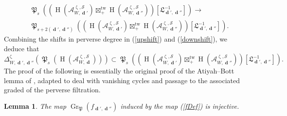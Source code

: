 \documentclass[a4paper,10pt]{amsart}
\renewcommand{\zeta}{\upzeta}
\newtheorem{proposition}[theorem]{Proposition}
\newtheorem{lemma}[theorem]{Lemma}
\DeclareMathOperator{\Pf}{\mathfrak{P}}
\newcommand{\SP}{\mathcal{S}}
\DeclareMathOperator{\tw}{tw}
\DeclareMathOperator{\Gr}{Gr}
\DeclareMathOperator{\dd}{\mathbf{d}}
\DeclareMathOperator{\HO}{H}
\begin{document}
\begin{align}
\nonumber&\Pf_s\left(\left(\HO(\mathcal{A}_{W,\dd'}^{\zeta,\SP})\boxtimes^{\tw}_+ \HO(\mathcal{A}_{W,\dd''}^{\zeta,\SP})\right)[\mathfrak{L}^{-1}_{\dd',\dd''}]\right)\rightarrow \\ \label{upshift}
&\Pf_{s+2(\dd',\dd'')}\left(\left(\HO(\mathcal{A}_{W,\dd'}^{\zeta,\SP})\boxtimes^{\tw}_+ \HO(\mathcal{A}_{W,\dd''}^{\zeta,\SP})\right)[\mathfrak{L}^{-1}_{\dd',\dd''}]\right).
\end{align}
Combining the shifts in perverse degree in (\ref{upshift}) and (\ref{downshift}), we deduce that
\[
\Delta^{\zeta}_{W,\dd',\dd''}\left(\Pf_s \left(\HO\left(\mathcal{A}^{\zeta,\SP}_{W,\dd}\right)\right)\right)\subset \Pf_s\left(\left(\HO(\mathcal{A}_{W,\dd'}^{\zeta,\SP})\boxtimes^{\tw}_+ \HO(\mathcal{A}_{W,\dd''}^{\zeta,\SP})\right)[\mathfrak{L}^{-1}_{\dd',\dd''}]\right).
\]
The proof of the following is essentially the original proof of the Atiyah--Bott lemma of \cite{AtBo83}, adapted to deal with vanishing cycles and passage to the associated graded of the perverse filtration.
\begin{lemma}
\label{PAB}
The map $\Gr_{\Pf}(f_{\dd',\dd''})$ induced by the map (\ref{fDef}) is injective.
\end{lemma}
\end{document}
